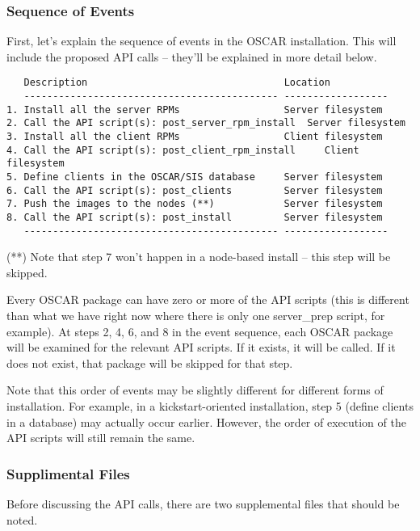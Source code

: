 \subsubsection{Sequence of Events}

First, let's explain the sequence of events in the OSCAR installation.
This will include the proposed API calls -- they'll be explained in
more detail below.  

\begin{verbatim}
   Description                                  Location
   -------------------------------------------- ------------------
1. Install all the server RPMs                  Server filesystem
2. Call the API script(s): post_server_rpm_install  Server filesystem
3. Install all the client RPMs                  Client filesystem
4. Call the API script(s): post_client_rpm_install     Client filesystem
5. Define clients in the OSCAR/SIS database     Server filesystem
6. Call the API script(s): post_clients         Server filesystem
7. Push the images to the nodes (**)            Server filesystem
8. Call the API script(s): post_install         Server filesystem
   -------------------------------------------- ------------------
\end{verbatim}

(**) Note that step 7 won't happen in a node-based install -- this
     step will be skipped.

Every OSCAR package can have zero or more of the API scripts (this is
different than what we have right now where there is only one
server\_prep script, for example).  At steps 2, 4, 6, and 8 in the
event sequence, each OSCAR package will be examined for the relevant
API scripts.  If it exists, it will be called.  If it does not exist,
that package will be skipped for that step.

Note that this order of events may be slightly different for different
forms of installation.  For example, in a kickstart-oriented
installation, step 5 (define clients in a database) may actually occur
earlier.  However, the order of execution of the API scripts will
still remain the same.


\subsubsection{Supplimental Files}

Before discussing the API calls, there are two supplemental files that
should be noted.


